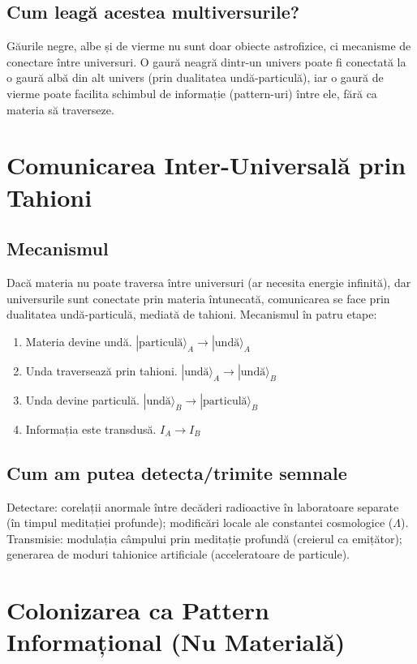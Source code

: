 \documentclass[11pt,a4paper]{article}
\begin{document}
\subsection{Cum leagă acestea multiversurile?}
Găurile negre, albe și de vierme nu sunt doar obiecte astrofizice, ci mecanisme de conectare între universuri. O gaură neagră dintr-un univers poate fi conectată la o gaură albă din alt univers (prin dualitatea undă-particulă), iar o gaură de vierme poate facilita schimbul de informație (pattern-uri) între ele, fără ca materia să traverseze.

\section{Comunicarea Inter-Universală prin Tahioni}
\subsection{Mecanismul}
Dacă materia nu poate traversa între universuri (ar necesita energie infinită), dar universurile sunt conectate prin materia întunecată, comunicarea se face prin dualitatea undă-particulă, mediată de tahioni. Mecanismul în patru etape:
\begin{enumerate}
    \item Materia devine undă. $|\text{particulă}\rangle_A \to |\text{undă}\rangle_A$
    \item Unda traversează prin tahioni. $|\text{undă}\rangle_A \to |\text{undă}\rangle_B$
    \item Unda devine particulă. $|\text{undă}\rangle_B \to |\text{particulă}\rangle_B$
    \item Informația este transdusă. $I_A \to I_B$
\end{enumerate}

\subsection{Cum am putea detecta/trimite semnale}
Detectare: corelații anormale între decăderi radioactive în laboratoare separate (în timpul meditației profunde); modificări locale ale constantei cosmologice ($\Lambda$). Transmisie: modulația câmpului prin meditație profundă (creierul ca emițător); generarea de moduri tahionice artificiale (acceleratoare de particule).

\section{Colonizarea ca Pattern Informațional (Nu Materială)}
\end{document}
